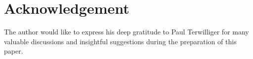 \documentclass[11pt]{article}%
\theoremstyle{definition}
\theoremstyle{plain}
\begin{document}




\section*{Acknowledgement}
The author would like to express his deep gratitude to Paul Terwilliger for many valuable discussions and insightful suggestions during the preparation of this paper.
\end{document}
